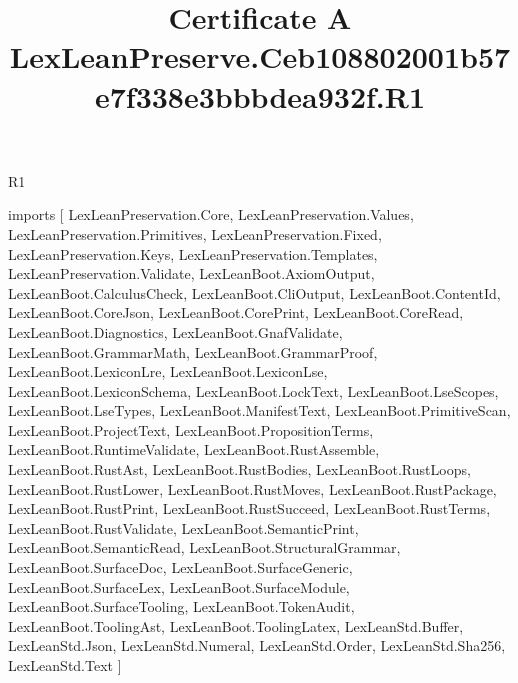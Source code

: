 \begin{lexlean}{R1}
\title{Certificate A LexLeanPreserve.Ceb108802001b57e7f338e3bbbdea932f.R1}
\begin{coremodule}
imports [
  LexLeanPreservation.Core,
  LexLeanPreservation.Values,
  LexLeanPreservation.Primitives,
  LexLeanPreservation.Fixed,
  LexLeanPreservation.Keys,
  LexLeanPreservation.Templates,
  LexLeanPreservation.Validate,
  LexLeanBoot.AxiomOutput,
  LexLeanBoot.CalculusCheck,
  LexLeanBoot.CliOutput,
  LexLeanBoot.ContentId,
  LexLeanBoot.CoreJson,
  LexLeanBoot.CorePrint,
  LexLeanBoot.CoreRead,
  LexLeanBoot.Diagnostics,
  LexLeanBoot.GnafValidate,
  LexLeanBoot.GrammarMath,
  LexLeanBoot.GrammarProof,
  LexLeanBoot.LexiconLre,
  LexLeanBoot.LexiconLse,
  LexLeanBoot.LexiconSchema,
  LexLeanBoot.LockText,
  LexLeanBoot.LseScopes,
  LexLeanBoot.LseTypes,
  LexLeanBoot.ManifestText,
  LexLeanBoot.PrimitiveScan,
  LexLeanBoot.ProjectText,
  LexLeanBoot.PropositionTerms,
  LexLeanBoot.RuntimeValidate,
  LexLeanBoot.RustAssemble,
  LexLeanBoot.RustAst,
  LexLeanBoot.RustBodies,
  LexLeanBoot.RustLoops,
  LexLeanBoot.RustLower,
  LexLeanBoot.RustMoves,
  LexLeanBoot.RustPackage,
  LexLeanBoot.RustPrint,
  LexLeanBoot.RustSucceed,
  LexLeanBoot.RustTerms,
  LexLeanBoot.RustValidate,
  LexLeanBoot.SemanticPrint,
  LexLeanBoot.SemanticRead,
  LexLeanBoot.StructuralGrammar,
  LexLeanBoot.SurfaceDoc,
  LexLeanBoot.SurfaceGeneric,
  LexLeanBoot.SurfaceLex,
  LexLeanBoot.SurfaceModule,
  LexLeanBoot.SurfaceTooling,
  LexLeanBoot.TokenAudit,
  LexLeanBoot.ToolingAst,
  LexLeanBoot.ToolingLatex,
  LexLeanStd.Buffer,
  LexLeanStd.Json,
  LexLeanStd.Numeral,
  LexLeanStd.Order,
  LexLeanStd.Sha256,
  LexLeanStd.Text
]


\end{coremodule}
\end{lexlean}
